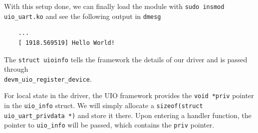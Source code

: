 \documentclass[../main.tex]{subfiles}
\begin{document}
    With this setup done, we can finally load the module with \texttt{sudo insmod uio\_uart.ko} and see the following output in \texttt{dmesg}

\begin{verbatim}
    ...
    [ 1918.569519] Hello World!
\end{verbatim}

    The \texttt{struct uioinfo} tells the framework the details of our driver and is passed through\\\texttt{devm\_uio\_register\_device}.

    For local state in the driver, the UIO framework provides the \texttt{void *priv} pointer in the \texttt{uio\_info} struct. We will simply allocate a \texttt{sizeof(struct uio\_uart\_privdata *)} and store it there. Upon entering a handler function, the pointer to \texttt{uio\_info} will be passed, which contains the \texttt{priv} pointer.


\end{document}
